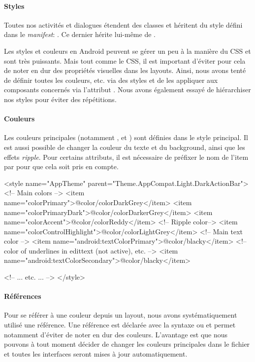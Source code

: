 \paragraph*{Styles} Toutes nos activités et dialogues étendent des classes  et héritent du style défini dans le \emph{manifest}: . Ce dernier hérite lui-même de .

Les styles et couleurs en Android peuvent se gérer un peu à la manière du CSS et sont très puissants. Mais tout comme le CSS, il est important d'éviter pour cela de noter en dur des propriétés visuelles dans les layouts. Ainsi, nous avons tenté de définir toutes les couleurs, etc. via des styles et de les appliquer aux composants concernés via l'attribut . Nous avons également essayé de hiérarchiser nos styles pour éviter des répétitions.

\paragraph*{Couleurs} Les couleurs principales (notamment ,  et ) sont définies dans le style principal. Il est aussi possible de changer la couleur du texte et du background, ainsi que les effets \emph{ripple}. Pour certains attributs, il est nécessaire de préfixer le nom de l'item par  pour que cela soit pris en compte.

\begin{xmlcode}
<style name="AppTheme" parent="Theme.AppCompat.Light.DarkActionBar">
    <!-- Main colors -->
    <item name="colorPrimary">@color/colorDarkGrey</item>
    <item name="colorPrimaryDark">@color/colorDarkerGrey</item>
    <item name="colorAccent">@color/colorReddy</item>
    <!-- Ripple color-->
    <item name="colorControlHighlight">@color/colorLightGrey</item>
    <!-- Main text color -->
    <item name="android:textColorPrimary">@color/blacky</item>
    <!--color of underlines in edittext (not active), etc. -->
    <item name="android:textColorSecondary">@color/blacky</item>

    <!-- ... etc. ... -->
</style>
\end{xmlcode}

\paragraph*{Références} Pour se référer à une couleur depuis un layout, nous avons systématiquement utilisé une référence. Une référence est déclarée avec la syntaxe  ou  et permet notamment d'éviter de noter en dur des couleurs. L'avantage est que nous pouvons à tout moment décider de changer les couleurs principales dans le fichier  et toutes les interfaces seront mises à jour automatiquement.

